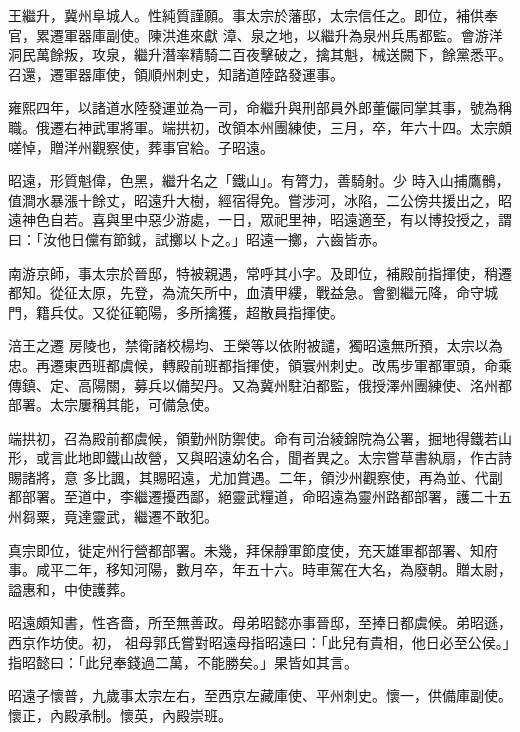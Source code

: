 \begin{pinyinscope}
 王繼升，冀州阜城人。性純質謹願。事太宗於藩邸，太宗信任之。即位，補供奉官，累遷軍器庫副使。陳洪進來獻
 漳、泉之地，以繼升為泉州兵馬都監。會游洋洞民萬餘叛，攻泉，繼升潛率精騎二百夜擊破之，擒其魁，械送闕下，餘黨悉平。召還，遷軍器庫使，領順州刺史，知諸道陸路發運事。



 雍熙四年，以諸道水陸發運並為一司，命繼升與刑部員外郎董儼同掌其事，號為稱職。俄遷右神武軍將軍。端拱初，改領本州團練使，三月，卒，年六十四。太宗頗嗟悼，贈洋州觀察使，葬事官給。子昭遠。



 昭遠，形質魁偉，色黑，繼升名之「鐵山」。有膂力，善騎射。少
 時入山捕鷹鶻，值澗水暴漲十餘丈，昭遠升大樹，經宿得免。嘗涉河，冰陷，二公傍共援出之，昭遠神色自若。喜與里中惡少游處，一日，眾祀里神，昭遠適至，有以博投授之，謂曰：「汝他日儻有節鉞，試擲以卜之。」昭遠一擲，六齒皆赤。



 南游京師，事太宗於晉邸，特被親遇，常呼其小字。及即位，補殿前指揮使，稍遷都知。從征太原，先登，為流矢所中，血漬甲縷，戰益急。會劉繼元降，命守城門，籍兵仗。又從征範陽，多所擒獲，超散員指揮使。



 涪王之遷
 房陵也，禁衛諸校楊均、王榮等以依附被譴，獨昭遠無所預，太宗以為忠。再遷東西班都虞候，轉殿前班都指揮使，領寰州刺史。改馬步軍都軍頭，命乘傳鎮、定、高陽關，募兵以備契丹。又為冀州駐泊都監，俄授澤州團練使、洺州都部署。太宗屢稱其能，可備急使。



 端拱初，召為殿前都虞候，領勤州防禦使。命有司治綾錦院為公署，掘地得鐵若山形，或言此地即鐵山故營，又與昭遠幼名合，聞者異之。太宗嘗草書紈扇，作古詩賜諸將，意
 多比諷，其賜昭遠，尤加賞遇。二年，領沙州觀察使，再為並、代副都部署。至道中，李繼遷擾西鄙，絕靈武糧道，命昭遠為靈州路都部署，護二十五州芻粟，竟達靈武，繼遷不敢犯。



 真宗即位，徙定州行營都部署。未幾，拜保靜軍節度使，充天雄軍都部署、知府事。咸平二年，移知河陽，數月卒，年五十六。時車駕在大名，為廢朝。贈太尉，謚惠和，中使護葬。



 昭遠頗知書，性吝嗇，所至無善政。母弟昭懿亦事晉邸，至捧日都虞候。弟昭遜，西京作坊使。初，
 祖母郭氏嘗對昭遠母指昭遠曰：「此兒有貴相，他日必至公侯。」指昭懿曰：「此兒奉錢過二萬，不能勝矣。」果皆如其言。



 昭遠子懷普，九歲事太宗左右，至西京左藏庫使、平州刺史。懷一，供備庫副使。懷正，內殿承制。懷英，內殿崇班。




\end{pinyinscope}
